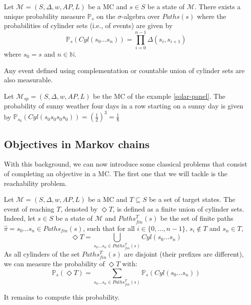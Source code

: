 \begin{theorem}\label{theo1}
  Let $\mathcal{M}=(S, \Delta, w, AP, L)$ be a MC and $s \in S$ be a state of $\mathcal{M}$. There exists a unique probability measure $\mathbb{P}_s$ on the
  $\sigma$-algebra over $Paths(s)$ where the probabilities of cylinder sets (i.e., of events) are given by
  \[
    \mathbb{P}_s(Cyl(s_0 \dots s_n)) = \prod_{i = 0}^{n - 1} \Delta(s_i, s_{i+1})
  \]
  where $s_0 = s$ and $n \in \mathbb{N}$.
\end{theorem}
\begin{corollary}
Any event defined using complementation or countable union of cylinder sets are also measurable.
\end{corollary}

\begin{example}
  Let $\mathcal{M}_{sp} = (S, \Delta, w, AP, L)$ be the MC of the example \ref{solar-panel}. The probability of sunny weather four days in a row starting on a sunny day is given
  by $\mathbb{P}_{s_0}(Cyl(s_0s_0s_0s_0)) = (\frac{1}{2})^3 = \frac{1}{8}$
\end{example}

\subsection{Objectives in Markov chains}

With this background, we can now introduce some classical problems that consist
of completing an objective in a MC. The first one that we will tackle is the reachability problem.
\begin{definition}
  Let $\mathcal{M} = (S, \Delta, w, AP, L)$ be a MC and $T \subseteq S$ be a set of target states. The event of reaching $T$, denoted by $\Diamond T$,
  is defined as a finite union of cylinder sets. Indeed, let $s \in S$ be a state of $\mathcal{M}$ and $Paths_{fin}^T(s)$ be the set of finite paths $\hat{\pi} = s_0 \dots s_n \in Paths_{fin}(s)$, such that for all $i \in \{0, \dots, n-1 \}, \, s_i \not \in T$ and $s_n \in T$,
  \[ \Diamond T = \bigcup_{s_0 \dots s_n \in Paths_{fin}^T(s)} Cyl(s_0 \dots s_n) \]
  As all cylinders of the set $Paths_{fin}^T(s)$ are disjoint (their prefixes are different), we can measure the probability of $\Diamond T$ with:
  \[
    \mathbb{P}_s(\Diamond T) = \sum_{s_0 \dots s_n \in Paths_{fin}^T(s)}  \mathbb{P}_s(Cyl(s_0 \dots s_n))
  \]
\end{definition}
It remains to compute this probability.


